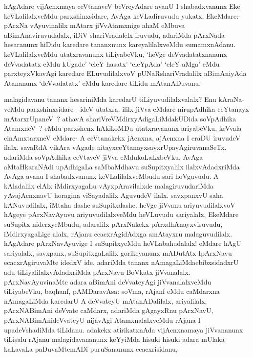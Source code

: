 \begin{artha}
hAgAdare vijAcnxmaya ceVtanaveV beVreyAdare avanU I shabadxvanunx
Eke keVLalilalxveMdu parxshinxsidare, AvAga keVLadiruvudu yukatx,
EkeMdare:- pArxNa vAyuvinalilx mAtarx jiVvAtamxnige ahaM eMbuva
aBimAnaviruvudalalx, iDiV shariVradalelx iruvudu, adariMda pArxNada
hesaranunx hiDidu karedare tananxnunx kareyalilalxveMdu sumamxnAdanu.
keVLalilalxveMdu utatxravanunx tiLiyabeVku, `heVge deVvadatatxnanunx
deVvadatatx eMdu kUgade' `eleY hasatx' `eleYpAda' `eleY aMga' eMdu
parxteyxVkavAgi karedare ELuvudilalxvoV pUNaRshariVradalilx aBimAniyAda
Atananunx `deVvadatatx' eMdu karedare tiLidu mAtanADuvanu. 
\end{artha}

\begin{artha}
malagidavanu tananx hesariniMda karedarU tiLiyuvudilalxvalalx? Enu
kAraNa-\break veMdu parxshinxsidare - ideV utatxra. ililx jiVva eMdare
nirupAdhika ceYtanayx mAtarxrUpaneV~? athavA
shariVreVMdirxyAdigaLiMdakUDida soVpAdhika AtamxneV~? eMdu parxshenx
hAkikoMDu utatxravanunx ariyabeVku, keVvala cinAmxtarxneV eMdare- A
ceVtanakekx jAcnxna, ajAcnxna I eraDU iruvudeV ilalx. savaRdA vikAra
vAgade nitayxceYtanayxsavxrUpavAgiruvanaSeTx. adariMda soVpAdhika
ceVtaveV jiVva eMdukoLaLxbeVku. AvAga aMtaHkaraNAdi upAdhigaLa
saMbaMdhavu suSupitxyalilx ilalxvAdadxriMda AvAga avanu I shabadxvanunx
keVLalilalxveMbudu sari hoVguvudu. A kAladalilx elAlx iMdirxyagaLu
vAyxpAravilalxde malagiruvudariMda yAvajAcnxnavU horagina viSayadalilx
AguvudeV ilalx. savxpanxvU saha kANuvudilalx, iMtaha dashe
suSupitxdashe. heVge jiVvanu ariyuvudilalxvoV hAgeye pArxNavAyuvu
ariyuvudilalxveMdu heVLuvudu sariyalalx, EkeMdare suSupitx
niderxyeMbudu, adaralilx pArxNakekx pArxdhAnayxviruvudu,
iMdirxyagaLige alalx, rAjanu ecacxrAgidAdxga amAtayxru
malaguvudilalx. hAgAdare pArxNavAyuvige I suSupitxyeMdu heVLabahudalalx! eMdare hAgU  sariyalalx, savxpanx, suSupitxgaLalilx gorikeyanunx
mADutAtx IpArxNavu ecacxrAgiruvaMte idedxV ide. adariMda tananx
nAmagaLiMda\break ebibxsidadxrU adu tiLiyalilalxvAdadxriMda pArxNavu BoVkatx
jiVvanalalx. pArxNavAyuvinaMte adara aBimAni deVvateyAgi
jiVvanalalxveMdu tiLiyabeVku, baqhanf, pAMDaravAsa: soVma, rAjanf eMdu
caMdarxna nAmagaLiMda karedarU A deVvateyU mAtanADalilalx,
ariyalilalx, pArxNABimAni deVvate caMdarx, adariMda gAgayxRnu
pArxNavU, pArxNABimAnideVvateyU nijavAgi AtamxnalalxveMdu rAjana I
upadeVshadiMda tiLidanu. adakekx atirikatxnAda vijAcnxnamaya
jiVvananunx tiLisalu rAjanu malagidavananunx keYyiMda hisuki hisuki
adara mUlaka kaLavaLa paDuvaMtemADi puruSananunx ecacxrisidanu,

\end{artha}
